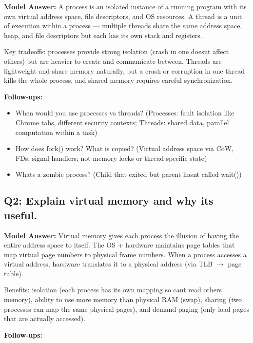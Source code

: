 \documentclass[11pt]{article}
\providecommand{\tightlist}{\setlength{\itemsep}{1pt}\setlength{\parskip}{0pt}}
\begin{document}
\textbf{Model Answer:} A process is an isolated instance of a running program with its own virtual address space, file descriptors, and OS resources. A thread is a unit of execution within a process --- multiple threads share the same address space, heap, and file descriptors but each has its own stack and registers.

Key tradeoffs: processes provide strong isolation (crash in one doesn\textquotesingle t affect others) but are heavier to create and communicate between. Threads are lightweight and share memory naturally, but a crash or corruption in one thread kills the whole process, and shared memory requires careful synchronization.

\textbf{Follow-ups:}

\begin{itemize}
\tightlist
\item
  When would you use processes vs threads? (Processes: fault isolation like Chrome tabs, different security contexts; Threads: shared data, parallel computation within a task)
\item
  How does fork() work? What is copied? (Virtual address space via CoW, FDs, signal handlers; not memory locks or thread-specific state)
\item
  What\textquotesingle s a zombie process? (Child that exited but parent hasn\textquotesingle t called wait())
\end{itemize}

\subsection{Q2: Explain virtual memory and why it\textquotesingle s useful.}\label{q2-explain-virtual-memory-and-why-its-useful}

\textbf{Model Answer:} Virtual memory gives each process the illusion of having the entire address space to itself. The OS + hardware maintains page tables that map virtual page numbers to physical frame numbers. When a process accesses a virtual address, hardware translates it to a physical address (via TLB \(\rightarrow\) page table).

Benefits: isolation (each process has its own mapping so can\textquotesingle t read others\textquotesingle{} memory), ability to use more memory than physical RAM (swap), sharing (two processes can map the same physical pages), and demand paging (only load pages that are actually accessed).

\textbf{Follow-ups:}
\end{document}
